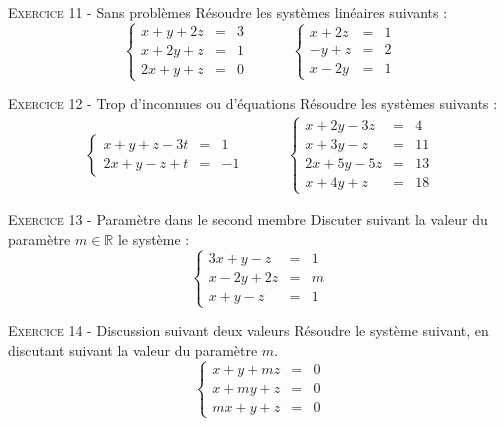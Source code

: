 

\vskip0.3cm\noindent\textsc{Exercice 11} - Sans problèmes
\vskip0.2cm
Résoudre les systèmes linéaires suivants :
$$\left\{
\begin{array}{rcl}
x+y+2z&=&3\\
x+2y+z&=&1\\
2x+y+z&=&0
\end{array}\right.
\quad\quad\quad
\left\{
\begin{array}{rcl}
x+2z&=&1\\
-y+z&=&2\\
x-2y&=&1
\end{array}\right.$$




\vskip0.3cm\noindent\textsc{Exercice 12} - Trop d'inconnues ou d'équations
\vskip0.2cm
Résoudre les systèmes suivants :
\begin{eqnarray*}
\left\{
\begin{array}{rcl}
x+y+z-3t&=&1\\
2x+y-z+t&=&-1
\end{array}\right.
\quad\quad\quad
\left\{
\begin{array}{rcl}
x+2y-3z&=&4\\
x+3y-z&=&11\\
2x+5y-5z&=&13\\
x+4y+z&=&18
\end{array}\right.
\end{eqnarray*}




\vskip0.3cm\noindent\textsc{Exercice 13} - Paramètre dans le second membre
\vskip0.2cm
Discuter suivant la valeur du paramètre $m\in\mathbb R$ le système :$$\left\{
\begin{array}{rcl}
3x+y-z&=&1\\
x-2y+2z&=&m\\
x+y-z&=&1
\end{array}\right.$$





\vskip0.3cm\noindent\textsc{Exercice 14} - Discussion suivant deux valeurs
\vskip0.2cm
Résoudre le système suivant, en discutant suivant la valeur du paramètre $m$.
$$\left\{
\begin{array}{rcl}
 x+y+mz&=&0\\
 x+my+z&=&0\\
 mx+y+z&=&0
\end{array}\right.$$


